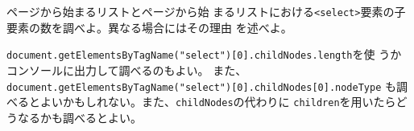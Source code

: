 \begin{Prob}\upshape\Must
 \pageref{pulldown1}ページから始まるリストと\pageref{pulldown2}ページから始
 まるリストにおける\texttt{<select>}要素の子要素の数を調べよ。異なる場合にはその理由
 を述べよ。

 \texttt{document.getElementsByTagName("select")[0].childNodes.length}を使
 うかコンソールに出力して調べるのもよい。
\ifText\newline\fi
また、
 \texttt{document.getElementsByTagName("select")[0].childNodes[0].nodeType}
 も調べるとよいかもしれない。また、\texttt{childNodes}の代わりに
 \texttt{children}を用いたらどうなるかも調べるとよい。
\end{Prob}
